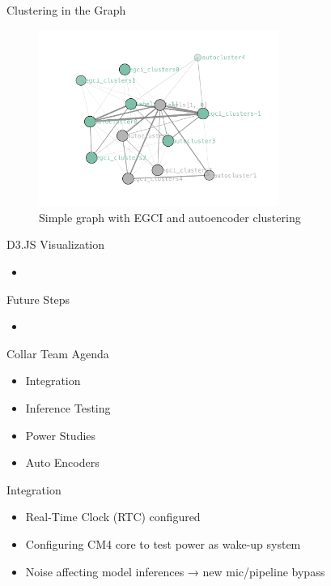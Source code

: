 \begin{frame}{Clustering in the Graph}
    \begin{figure}
        \centering
        \includegraphics[height=0.7\textheight,width=0.7\textwidth,keepaspectratio]{images/graph_clustering.png}
        \caption{Simple graph with EGCI and autoencoder clustering}
    \end{figure}
    
\end{frame}

\begin{frame}{D3.JS Visualization}
    \begin{itemize}
        \item 
    \end{itemize}
\end{frame}

\begin{frame}{Future Steps}
    \begin{itemize}
        \item 
    \end{itemize}
\end{frame}

\begin{frame}{Collar Team Agenda}
    \begin{itemize}
        \item Integration
        \item Inference Testing
        \item Power Studies
        \item Auto Encoders       
    \end{itemize}
\end{frame}

\begin{frame}{Integration}
    \begin{itemize}
        \item Real-Time Clock (RTC) configured
        \item Configuring CM4 core to test power as wake-up system
        \item Noise affecting model inferences → new mic/pipeline bypass
    \end{itemize}
\end{frame}

